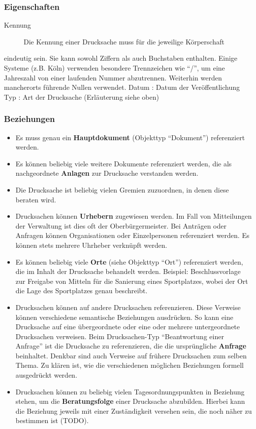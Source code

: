 \documentclass[,a4paper]{article}
\begin{document}
\subsubsection{Eigenschaften}

\begin{description}
\item[Kennung]
Die Kennung einer Drucksache muss für die jeweilige Körperschaft
\end{description}

eindeutig sein. Sie kann sowohl Ziffern als auch Buchstaben enthalten.
Einige Systeme (z.B. Köln) verwenden besondere Trennzeichen wie ``/'',
um eine Jahreszahl von einer laufenden Nummer abzutrennen. Weiterhin
werden mancherorts führende Nullen verwendet. Datum : Datum der
Veröffentlichung Typ : Art der Drucksache (Erläuterung siehe oben)

\subsubsection{Beziehungen}

\begin{itemize}
\item
  Es muss genau ein \textbf{Hauptdokument} (Objekttyp ``Dokument'')
  referenziert werden.
\item
  Es können beliebig viele weitere Dokumente referenziert werden, die
  als nachgeordnete \textbf{Anlagen} zur Drucksache verstanden werden.
\item
  Die Drucksache ist beliebig vielen Gremien zuzuordnen, in denen diese
  beraten wird.
\item
  Drucksachen können \textbf{Urhebern} zugewiesen werden. Im Fall von
  Mitteilungen der Verwaltung ist dies oft der Oberbürgermeister. Bei
  Anträgen oder Anfragen können Organisationen oder Einzelpersonen
  referenziert werden. Es können stets mehrere Uhrheber verknüpft
  werden.
\item
  Es können beliebig viele \textbf{Orte} (siehe Objekttyp ``Ort'')
  referenziert werden, die im Inhalt der Drucksache behandelt werden.
  Beispiel: Beschlussvorlage zur Freigabe von Mitteln für die Sanierung
  eines Sportplatzes, wobei der Ort die Lage des Sportplatzes genau
  beschreibt.
\item
  Drucksachen können auf andere Drucksachen referenzieren. Diese
  Verweise können verschiedene semantische Beziehungen ausdrücken. So
  kann eine Drucksache auf eine übergeordnete oder eine oder mehrere
  untergeordnete Drucksachen verweisen. Beim Drucksachen-Typ
  ``Beantwortung einer Anfrage'' ist die Drucksache zu referenzieren,
  die die ursprüngliche \textbf{Anfrage} beinhaltet. Denkbar sind auch
  Verweise auf frühere Drucksachen zum selben Thema. Zu klären ist, wie
  die verschiedenen möglichen Beziehungen formell ausgedrückt werden.
\item
  Drucksachen können zu beliebig vielen Tagesordnungspunkten in
  Beziehung stehen, um die \textbf{Beratungsfolge} einer Drucksache
  abzubilden. Hierbei kann die Beziehung jeweils mit einer Zuständigkeit
  versehen sein, die noch näher zu bestimmen ist (TODO).
\end{itemize}
\end{document}

